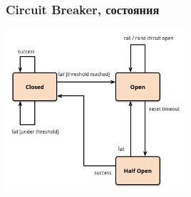 \documentclass{../mcsslides}
\begin{document}
    \begin{frame}
        \frametitle{Circuit Breaker, состояния}
        \begin{center}
            \includegraphics[width=0.5\textwidth]{circuitBreakerStates.png}
        \end{center}
    \end{frame}
\end{document}
